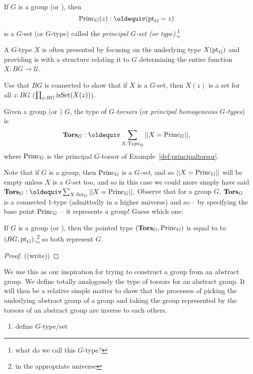 \begin{example}\label{def:principaltorsor}
  If $G$ is a group (or \inftygp), then 
$$\princ_G(z)\defequi(\pt_G=z)$$ is a $G$-set (or $G$-type) called the {\em principal $G$-set (or type)}.\footnote{what do we call this $G$-type?}
\end{example}

\begin{remark}
  A $G$-type $X$ is often presented by focusing on the underlying type $X({\mathord{\mathrm{pt}}}_G)$  and providing is with a structure relating it to $G$ determining the entire function $X\colon BG\to\mathcal U$. 
\end{remark}

\begin{xca}
  Use that $BG$ is connected to show that if $X$ is a $G$-set, then $X(z)$ is a set for all $z:BG$ (\ie $\prod_{z:BG}\mathrm{isSet}(X(z))$).
\end{xca}
\begin{definition}
  Given a group (or \inftygp) $G$, the type of {\em$G$-torsors} (or {\em principal homogeneous $G$-types}) is  
$$\typetorsor_G\defequi\sum_{X:\Type_G}||X=\princ_G||,$$
where $\mathrm{Princ}_G$ is the principal $G$-torsor of Example~\ref{def:principaltorsor}. 
\end{definition}
\begin{remark}
  Note that if $G$ is a group, then $\mathrm{Princ}_G$ is a $G${\em-set}, and so $||X=\mathrm{Princ}_G||$ will be empty unless $X$ is a $G$-set too, and so in this case we could more simply have said $\typetorsor_G\defequi\sum_{X:\Set_G}||X=\princ_G||.$  Observe that for a group $G$, $\mathbf{Tors}_G$ is a connected $1$-type (admittedly in a higher universe) and so -- by specifying the base point $\mathrm{Princ}_G$ -- it represents a group!  Guess which one:
\end{remark}
\begin{lemma}
  If $G$ is a group (or \inftygp), then the pointed type $(\mathbf{Tors}_G,\mathrm{Princ}_G)$ is equal to to $(BG,{\mathord{\mathrm{pt}}}_G)$,\footnote{in the appropriate universe} so both represent $G$. 
\end{lemma}

\begin{proof}
  ((write))
\end{proof}

We use this as our inspiration for trying to construct a group from an abstract group.  We define totally analogously the type of torsors for an abstract group.  It will then be a relative simple matter to show that the processes of picking the underlying abstract group of a group and taking the group represented by the torsors of an abstract group are inverse to each others.
\begin{enumerate}
\item define $G$-type/set
\end{enumerate}

